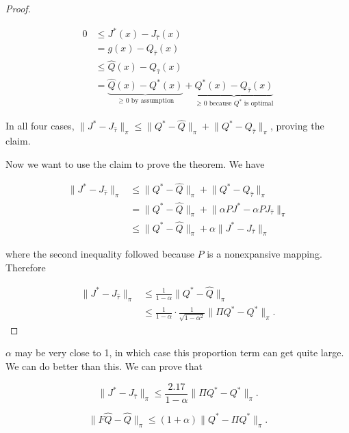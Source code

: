 \begin{proof}
\begin{enumerate}
 \begin{align*}
 0 & \leq J^*(x) - J_{\hat{\tau}}(x) 
 \\ & = g(x) - Q_{\hat{\tau}}(x) 
 \\ & \leq \hat{Q}(x) - Q_{\hat{\tau}}(x)
 \\& = \underbrace{\hat{Q}(x) - Q^*(x)}_{\geq 0 \text{ by assumption}}  + \underbrace{Q^*(x) - Q_{\hat{\tau}}(x)}_{\geq 0 \text{ because \(Q^*\) is optimal}}
 \end{align*}
 
 \end{enumerate}
 
 In all four cases, \(\lVert J^* - J_{\hat{\tau}} \rVert_\pi \leq \lVert Q^* - \hat{Q} \rVert_\pi +  \lVert Q^* -  Q_{\hat{\tau}} \rVert_\pi \), proving the claim. 
 
 Now we want to use the claim to prove the theorem. We have
 
 \begin{align*}
 \lVert J^* - J_{\hat{\tau}} \rVert_\pi & \leq \lVert Q^* - \hat{Q} \rVert_\pi +  \lVert Q^* -  Q_{\hat{\tau}} \rVert_\pi
 \\ & =  \lVert Q^* - \hat{Q} \rVert_\pi +  \lVert \alpha P J^* - \alpha PJ_{\hat{\tau}}  \rVert_\pi
 \\ & \leq \lVert Q^* - \hat{Q} \rVert_\pi +   \alpha  \lVert  J^* - J_{\hat{\tau}}  \rVert_\pi
 \end{align*}
 
 where the second inequality followed because \(P\) is a nonexpansive mapping. Therefore
 
 \begin{align*}
  \lVert J^* - J_{\hat{\tau}} \rVert_\pi & \leq \frac{1}{1-\alpha}  \lVert Q^* - \hat{Q} \rVert_\pi 
  \\ & \leq \frac{1}{1-\alpha} \cdot \frac{1}{\sqrt{1-\alpha^2}} \lVert \Pi Q^* - Q^* \rVert_\pi.
 \end{align*}
 
 \end{proof}
 
 \(\alpha\) may be very close to 1, in which case this proportion term can get quite large. We can do better than this. We can prove that 
 
 \[
   \lVert J^* - J_{\hat{\tau}} \rVert_\pi  \leq \frac{2.17}{1 - \alpha}  \lVert \Pi Q^* - Q^* \rVert_\pi.
 \]
 
 \begin{lemma}
 
 \[
 \lVert F \hat{Q} - \hat{Q} \rVert_\pi \leq (1 + \alpha) \lVert Q^* - \Pi Q^* \rVert_\pi.
 \]
 
 \end{lemma}


